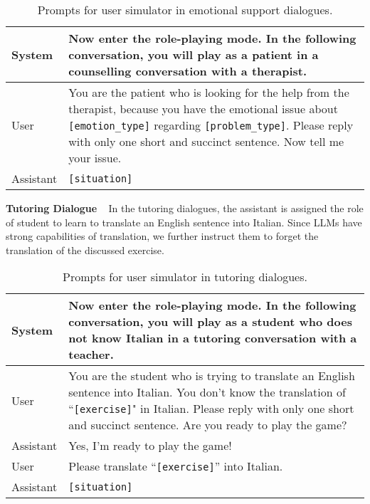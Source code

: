 \documentclass{article} %
\begin{document}
\begin{table}[h]
    \centering
    \begin{tabular}{lp{11cm}}
    \toprule
    System   &  Now enter the role-playing mode. In the following conversation, you will play as a patient in a counselling conversation with a therapist. \\
    \midrule
    User    &  You are the patient who is looking for the help from the therapist, because you have the emotional issue about \texttt{[emotion\_type]} regarding \texttt{[problem\_type]}. Please reply with only one short and succinct sentence. Now tell me your issue.\\
    \midrule
    Assistant & \texttt{[situation]} \\
    \bottomrule
    \end{tabular}
    \caption{Prompts for user simulator in emotional support dialogues.}
    \label{tab:esc_user}
\end{table}


\noindent \textbf{Tutoring Dialogue} ~ 
In the tutoring dialogues, the assistant is assigned the role of student to learn to translate an English sentence into Italian. 
Since LLMs have strong capabilities of translation, we further instruct them to forget the translation of the discussed exercise. 

\begin{table}[h]
    \centering
    \begin{tabular}{lp{11cm}}
    \toprule
    System   &  Now enter the role-playing mode. In the following conversation, you will play as a student who does not know Italian in a tutoring conversation with a teacher. \\
    \midrule
    User    &  You are the student who is trying to translate an English sentence into Italian. You don't know the translation of ``\texttt{[exercise]}" in Italian. Please reply with only one short and succinct sentence. Are you ready to play the game?\\
    \midrule
    Assistant & Yes, I'm ready to play the game! \\
    \midrule
    User & Please translate ``\texttt{[exercise]}” into Italian. \\
    \midrule
    Assistant & \texttt{[situation]}\\
    \bottomrule
    \end{tabular}
    \caption{Prompts for user simulator in tutoring dialogues.}
    \label{tab:cima_user}
\end{table}
\end{document}
